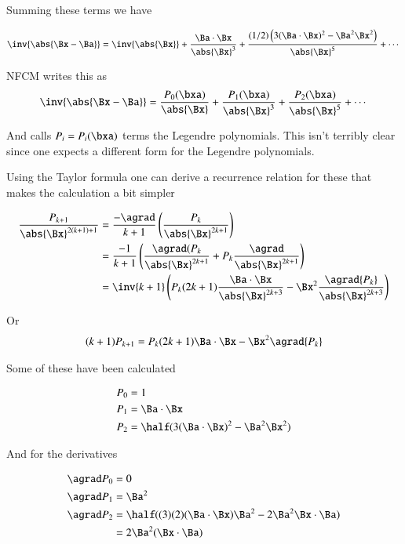 Summing these terms we have

\[
\inv{\abs{\Bx -\Ba}} =
\inv{\abs{\Bx}} +
\frac{ \Ba \cdot \Bx } { {\abs{\Bx}}^3 } +
\frac{ (1/2)\left( 3 (\Ba \cdot \Bx)^2 - \Ba^2 \Bx^2 \right) } { {{\abs{\Bx}}^5} } + \cdots
\]

NFCM writes this as
\[
\inv{\abs{\Bx -\Ba}} =
\frac{ P_0(\bxa) } {  \abs{\Bx}} +
\frac{ P_1(\bxa) } { {\abs{\Bx}}^3 } +
\frac{ P_2(\bxa) } { {\abs{\Bx}}^5 } + \cdots
\]

And calls $P_i = P_i(\bxa)$ terms the Legendre polynomials.  This isn't terribly clear since one expects a different form for the Legendre polynomials.

Using the Taylor formula one can derive a recurrence relation for these that makes the calculation a bit
simpler

\begin{align*}
\frac{P_{k+1}}{\abs{\Bx}^{2(k+1)+1}}
&= \frac{-\agrad}{k+1}\left(\frac{P_k}{\abs{\Bx}^{2k+1}}\right) \\
&= 
\frac{-1}{k+1}
\left(
\frac{\agrad({P_k}}
{\abs{\Bx}^{2k+1}}
+
{P_k}\frac{\agrad}
{\abs{\Bx}^{2k+1}}
\right) \\
&= 
\inv{k+1}
\left(
{P_k}(2k+1) \frac{\Ba \cdot \Bx}
{\abs{\Bx}^{2k+3}}
-\Bx^2 \frac{\agrad{P_k}}
{\abs{\Bx}^{2k+3}}
\right) \\
\end{align*}

Or
\begin{align*}
(k+1){P_{k+1}}
=
{P_k}(2k+1) {\Ba \cdot \Bx}
-\Bx^2 {\agrad{P_k}}
\end{align*}

Some of these have been calculated

\begin{align*}
P_0 &= 1 \\
P_1 &= \Ba \cdot \Bx \\
P_2 &= \half(3(\Ba \cdot \Bx)^2 -\Ba^2\Bx^2) \\
\end{align*}

And for the derivatives

\begin{align*}
\agrad P_0 &= 0 \\
\agrad P_1 &= \Ba^2 \\
\agrad P_2 &= \half((3)(2)(\Ba \cdot \Bx)\Ba^2 - 2\Ba^2\Bx \cdot \Ba) \\
           &= 2\Ba^2(\Bx \cdot \Ba) \\
\end{align*}

